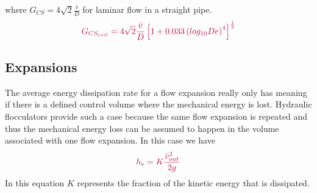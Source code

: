 \documentclass[letterpaper,10pt,english]{sphinxmanual}
\begin{document}
where \(G_{CS} =4\sqrt2 \frac{\bar v}{D}\) for laminar flow in a straight pipe.
\begin{equation}\label{equation:Rapid_Mix/RM_Derivations:Rapid_Mix/RM_Derivations:67}
\begin{split}\color{purple}{
  G_{CS_{coil}} = 4\sqrt2 \frac{\bar v}{D}\left[ 1 + 0.033\left(log_{10}De\right)^4  \right]^\frac{1}{2}
}\end{split}
\end{equation}

\subsection{Expansions}
\label{\detokenize{Rapid_Mix/RM_Derivations:expansions}}\label{\detokenize{Rapid_Mix/RM_Derivations:heading-expansions}}
The average energy dissipation rate for a flow expansion really only has meaning if there is a defined control volume where the mechanical energy is lost. Hydraulic flocculators provide such a case because the same flow expansion is repeated and thus the mechanical energy loss can be assumed to happen in the volume associated with one flow expansion. In this case we have
\begin{equation}\label{equation:Rapid_Mix/RM_Derivations:Rapid_Mix/RM_Derivations:68}
\begin{split}\color{purple}{
  h_e =  K\frac{\bar v_{out}^2}{2g}
}\end{split}
\end{equation}
In this equation \(K\) represents the fraction of the kinetic energy that is dissipated.
\end{document}
